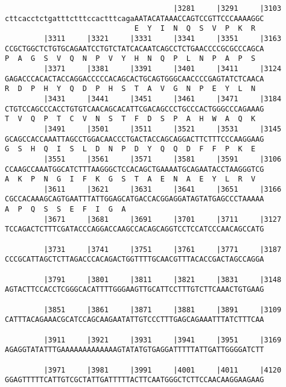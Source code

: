 \documentclass{article}
\begin{document}
\begin{Verbatim}
                                       |3281     |3291     |3103
cttcacctctgatttctttccactttcagaAATACATAAACCAGTCCGTTCCCAAAAGGC
                              E  Y  I  N  Q  S  V  P  K  R  
         |3311     |3321     |3331     |3341     |3351     |3163
CCGCTGGCTCTGTGCAGAATCCTGTCTATCACAATCAGCCTCTGAACCCCGCGCCCAGCA
P  A  G  S  V  Q  N  P  V  Y  H  N  Q  P  L  N  P  A  P  S  
         |3371     |3381     |3391     |3401     |3411     |3124
GAGACCCACACTACCAGGACCCCCACAGCACTGCAGTGGGCAACCCCGAGTATCTCAACA
R  D  P  H  Y  Q  D  P  H  S  T  A  V  G  N  P  E  Y  L  N  
         |3431     |3441     |3451     |3461     |3471     |3184
CTGTCCAGCCCACCTGTGTCAACAGCACATTCGACAGCCCTGCCCACTGGGCCCAGAAAG
T  V  Q  P  T  C  V  N  S  T  F  D  S  P  A  H  W  A  Q  K  
         |3491     |3501     |3511     |3521     |3531     |3145
GCAGCCACCAAATTAGCCTGGACAACCCTGACTACCAGCAGGACTTCTTTCCCAAGGAAG
G  S  H  Q  I  S  L  D  N  P  D  Y  Q  Q  D  F  F  P  K  E  
         |3551     |3561     |3571     |3581     |3591     |3106
CCAAGCCAAATGGCATCTTTAAGGGCTCCACAGCTGAAAATGCAGAATACCTAAGGGTCG
A  K  P  N  G  I  F  K  G  S  T  A  E  N  A  E  Y  L  R  V  
         |3611     |3621     |3631     |3641     |3651     |3166
CGCCACAAAGCAGTGAATTTATTGGAGCATGACCACGGAGGATAGTATGAGCCCTAAAAA
A  P  Q  S  S  E  F  I  G  A                                
         |3671     |3681     |3691     |3701     |3711     |3127
TCCAGACTCTTTCGATACCCAGGACCAAGCCACAGCAGGTCCTCCATCCCAACAGCCATG
                                                            
         |3731     |3741     |3751     |3761     |3771     |3187
CCCGCATTAGCTCTTAGACCCACAGACTGGTTTTGCAACGTTTACACCGACTAGCCAGGA
                                                            
         |3791     |3801     |3811     |3821     |3831     |3148
AGTACTTCCACCTCGGGCACATTTTGGGAAGTTGCATTCCTTTGTCTTCAAACTGTGAAG
                                                            
         |3851     |3861     |3871     |3881     |3891     |3109
CATTTACAGAAACGCATCCAGCAAGAATATTGTCCCTTTGAGCAGAAATTTATCTTTCAA
                                                            
         |3911     |3921     |3931     |3941     |3951     |3169
AGAGGTATATTTGAAAAAAAAAAAAAGTATATGTGAGGATTTTTATTGATTGGGGATCTT
                                                            
         |3971     |3981     |3991     |4001     |4011     |4120
GGAGTTTTTCATTGTCGCTATTGATTTTTACTTCAATGGGCTCTTCCAACAAGGAAGAAG
                                                            

\end{Verbatim}
\end{document}
